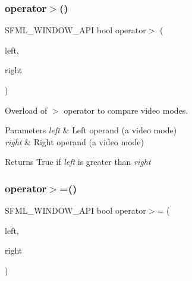 \subsubsection{\texorpdfstring{operator$>$()}{operator>()}}
{\footnotesize\ttfamily S\+F\+M\+L\+\_\+\+W\+I\+N\+D\+O\+W\+\_\+\+A\+PI bool operator$>$ (\begin{DoxyParamCaption}\item[{const \mbox{\hyperlink{classsf_1_1_video_mode}{Video\+Mode}} \&}]{left,  }\item[{const \mbox{\hyperlink{classsf_1_1_video_mode}{Video\+Mode}} \&}]{right }\end{DoxyParamCaption})\hspace{0.3cm}{\ttfamily [related]}}



Overload of $>$ operator to compare video modes. 


\begin{DoxyParams}{Parameters}
{\em left} & Left operand (a video mode) \\
\hline
{\em right} & Right operand (a video mode)\\
\hline
\end{DoxyParams}
\begin{DoxyReturn}{Returns}
True if {\itshape left} is greater than {\itshape right} \begin{DoxyVerb}\end{DoxyVerb}
 
\end{DoxyReturn}
\mbox{\label{classsf_1_1_video_mode_a7f7983e336203d34c9878c77fff60f1f}} 
\subsubsection{\texorpdfstring{operator$>$=()}{operator>=()}}
{\footnotesize\ttfamily S\+F\+M\+L\+\_\+\+W\+I\+N\+D\+O\+W\+\_\+\+A\+PI bool operator$>$= (\begin{DoxyParamCaption}\item[{const \mbox{\hyperlink{classsf_1_1_video_mode}{Video\+Mode}} \&}]{left,  }\item[{const \mbox{\hyperlink{classsf_1_1_video_mode}{Video\+Mode}} \&}]{right }\end{DoxyParamCaption})\hspace{0.3cm}{\ttfamily [related]}}




